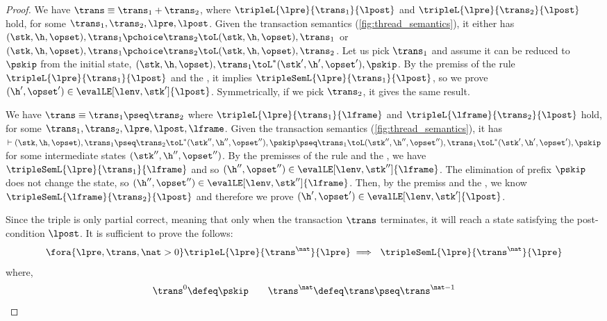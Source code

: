 \begin{proof}
We have  \(\trans \equiv \trans_{1} + \trans_{2} \), where \( \tripleL{\lpre}{\trans_{1}}{\lpost} \) and \( \tripleL{\lpre}{\trans_{2}}{\lpost} \) hold, for some \( \trans_{1}, \trans_{2}, \lpre, \lpost \).
Given the transaction semantics (\cref{fig:thread_semantics}), it either has \( ( \stk, \h, \opset ), \trans_{1} \pchoice \trans_{2} \toL ( \stk, \h, \opset ), \trans_{1} \) or  \( ( \stk, \h, \opset ), \trans_{1} \pchoice \trans_{2} \toL ( \stk, \h, \opset ), \trans_{2} \).
Let us pick \( \trans_{1} \) and  assume it can be reduced to \( \pskip \) from the initial state, \ie \( ( \stk, \h, \opset ), \trans_{1}  \toL^{*} ( \stk', \h', \opset' ), \pskip \).
By the premiss of the rule \( \tripleL{\lpre}{\trans_{1}}{\lpost} \) and the \ih, it implies \( \tripleSemL{\lpre}{\trans_{1}}{\lpost} \), so we prove \( (\h', \opset') \in \evalLE[\lenv, \stk']{\lpost} \).
Symmetrically, if we pick \( \trans_{2} \), it gives the same result.


We have \( \trans \equiv \trans_{1} \pseq \trans_{2} \) where \( \tripleL{\lpre}{\trans_{1}}{\lframe} \) and \( \tripleL{\lframe}{\trans_{2}}{\lpost} \) hold, for some \( \trans_{1}, \trans_{2}, \lpre, \lpost, \lframe \).
Given the transaction semantics (\cref{fig:thread_semantics}), 
it has \( \vdash ( \stk, \h, \opset ), \trans_{1} \pseq \trans_{2} \toL^{*} ( \stk'', \h'', \opset'' ), \pskip \pseq \trans_{1} \toL ( \stk'', \h'', \opset'' ), \trans_{1} \toL^{*} ( \stk', \h', \opset' ), \pskip \) for some intermediate states \( (\stk'', \h'', \opset'') \).
By the premisses of the rule and the \ih, we have \( \tripleSemL{\lpre}{\trans_{1}}{\lframe} \) and so \( (\h'', \opset'') \in \evalLE[\lenv, \stk'']{\lframe} \).
The elimination of prefix \( \pskip \) does not change the state, so \( (\h'', \opset'') \in \evalLE[\lenv, \stk'']{\lframe} \).
Then, by the premiss and the \ih, we know \( \tripleSemL{\lframe}{\trans_{2}}{\lpost} \) and therefore we prove \( (\h', \opset') \in \evalLE[\lenv, \stk']{\lpost} \).


Since the triple is only partial correct, 
meaning that only when the transaction \( \trans \) terminates, it will reach a state satisfying the post-condition \( \lpost \).
It is sufficient to prove the follows:
\[
    \fora{\lpre, \trans, \nat > 0} \tripleL{\lpre}{\trans^{\nat}}{\lpre} \implies \ \tripleSemL{\lpre}{\trans^{\nat}}{\lpre} 
\]
where,
\[
    \trans^{0} \defeq  \pskip \qquad
    \trans^{\nat} \defeq  \trans \pseq \trans^{\nat - 1} 
\]


\end{proof}

